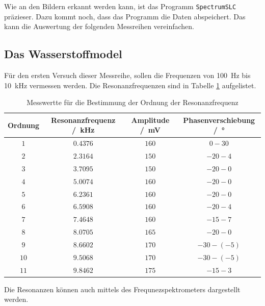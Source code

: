 Wie an den Bildern erkannt werden kann, ist das Programm \texttt{SpectrumSLC} präzieser. Dazu kommt noch, dass das Programm die 
Daten abspeichert. Das kann die Auswertung der folgenden Messreihen vereinfachen.

\subsection{Das Wasserstoffmodel}
Für den ersten Versuch dieser Messreihe, sollen die Frequenzen von \SI{100}{\hertz} bis \SI{10}{\kilo\hertz} vermessen werden.
Die Resonanzfrequenzen sind in Tabelle \ref{tab:Resonanzfrequenzen} aufgelistet.
\FloatBarrier
\begin{table}
    \centering
    \caption{Messwertte für die Bestimmung der Ordnung der Resonanzfrequenz}
    \label{tab:Resonanzfrequenzen}
    \begin{tabular}{c c c c}
        \toprule
        Ordnung&Resonanzfrequenz /\SI{}{\kilo\hertz} &Amplitude /\SI{}{\milli\volt}& Phasenverschiebung /\SI{}{\degree}\\
        \midrule
        $\num{1}$&$\num{0.4376}$&$\num{160}$&$\num{0}-  \num{30}$\\
        $\num{2}$&$\num{2.3164}$&$\num{150}$&$\num{-20}-\num{4}$\\
        $\num{3}$&$\num{3.7095}$&$\num{150}$&$\num{-20}-\num{0}$\\
        $\num{4}$&$\num{5.0074}$&$\num{160}$&$\num{-20}-\num{0}$\\
        $\num{5}$&$\num{6.2361}$&$\num{160}$&$\num{-20}-\num{0}$\\
        $\num{6}$&$\num{6.5908}$&$\num{160}$&$\num{-20}-\num{4}$\\
        $\num{7}$&$\num{7.4648}$&$\num{160}$&$\num{-15}-\num{7}$\\
        $\num{8}$&$\num{8.0705}$&$\num{165}$&$\num{-20}-\num{0}$\\
        $\num{9}$&$\num{8.6602}$&$\num{170}$&$\num{-30}-(\num{-5})$\\
        $\num{10}$&$\num{9.5068}$&$\num{170}$&$\num{-30}-(\num{-5})$\\
        $\num{11}$&$\num{9.8462}$&$\num{175}$&$\num{-15}-\num{3}$\\
        \bottomrule
    \end{tabular}
\end{table}
\FloatBarrier
Die Resonanzen können auch mittels des Frequnezspektrometers dargestellt werden.
\FloatBarrier
